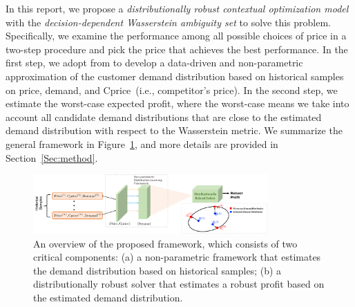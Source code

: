 \documentclass[competition,nonblindrev, 12pt]{informs3-competition}
\theoremstyle{TH}%
\theoremstyle{TH}%
\begin{document}
In this report, we propose a \emph{distributionally robust contextual optimization model} with the \emph{decision-dependent Wasserstein ambiguity set} to solve this problem.
Specifically, we examine the performance among all possible choices of price in a two-step procedure and pick the price that achieves the best performance.
In the first step, we adopt from \citep{bertsimas2020predictive} to develop a data-driven and non-parametric approximation of the customer demand distribution based on historical samples on price, demand, and Cprice~(i.e., competitor's price).
In the second step, we estimate the worst-case expected profit, where the worst-case means we take into account all candidate demand distributions that are close to the estimated demand distribution with respect to the Wasserstein metric.
We summarize the general framework in Figure~\ref{fig:diagram_0925}, and more details are provided in Section~\ref{Sec:method}.
\begin{figure}[t]
    \centering
    \includegraphics[width=0.8\textwidth]{diagram_0925_new.pdf}
    \caption{An overview of the proposed framework, which consists of two critical components: (a) a non-parametric framework that estimates the demand distribution based on historical samples; (b) a distributionally robust solver that estimates a robust profit based on the estimated demand distribution.}
    \vspace{-1em}
    \label{fig:diagram_0925}
\end{figure}



\vspace{-1em}
\end{document}
